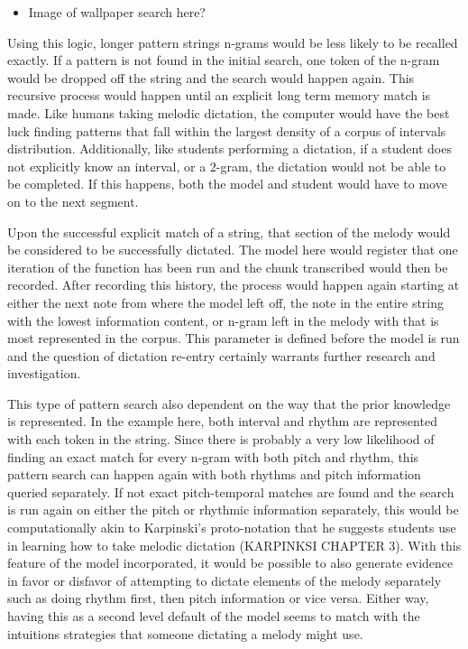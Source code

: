 \documentclass[]{book}
\providecommand{\tightlist}{%
  \setlength{\itemsep}{0pt}\setlength{\parskip}{0pt}}
\theoremstyle{definition}
\theoremstyle{definition}
\theoremstyle{definition}
\theoremstyle{remark}
\begin{document}
\begin{itemize}
\tightlist
\item
  Image of wallpaper search here?
\end{itemize}

Using this logic, longer pattern strings n-grams would be less likely to
be recalled exactly. If a pattern is not found in the initial search,
one token of the n-gram would be dropped off the string and the search
would happen again. This recursive process would happen until an
explicit long term memory match is made. Like humans taking melodic
dictation, the computer would have the best luck finding patterns that
fall within the largest density of a corpus of intervals distribution.
Additionally, like students performing a dictation, if a student does
not explicitly know an interval, or a 2-gram, the dictation would not be
able to be completed. If this happens, both the model and student would
have to move on to the next segment.

Upon the successful explicit match of a string, that section of the
melody would be considered to be successfully dictated. The model here
would register that one iteration of the function has been run and the
chunk transcribed would then be recorded. After recording this history,
the process would happen again starting at either the next note from
where the model left off, the note in the entire string with the lowest
information content, or n-gram left in the melody with that is most
represented in the corpus. This parameter is defined before the model is
run and the question of dictation re-entry certainly warrants further
research and investigation.

This type of pattern search also dependent on the way that the prior
knowledge is represented. In the example here, both interval and rhythm
are represented with each token in the string. Since there is probably a
very low likelihood of finding an exact match for every n-gram with both
pitch and rhythm, this pattern search can happen again with both rhythms
and pitch information queried separately. If not exact pitch-temporal
matches are found and the search is run again on either the pitch or
rhythmic information separately, this would be computationally akin to
Karpinski's proto-notation that he suggests students use in learning how
to take melodic dictation (KARPINKSI CHAPTER 3). With this feature of
the model incorporated, it would be possible to also generate evidence
in favor or disfavor of attempting to dictate elements of the melody
separately such as doing rhythm first, then pitch information or vice
versa. Either way, having this as a second level default of the model
seems to match with the intuitions strategies that someone dictating a
melody might use.
\end{document}
